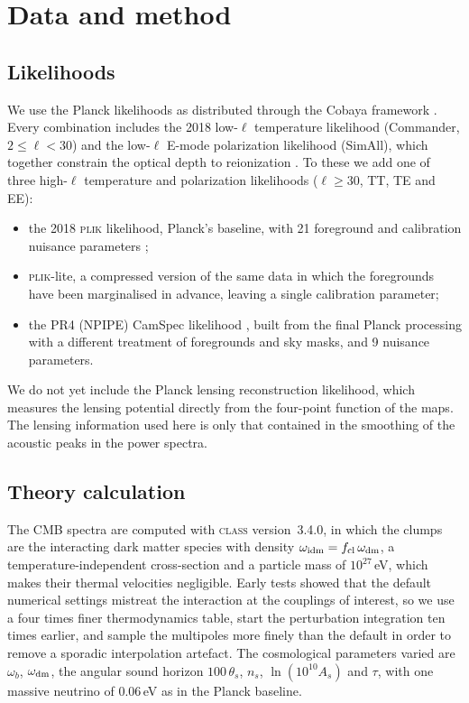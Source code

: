 \documentclass[11pt,a4paper]{article}
\newcommand{\cl}{\mathrm{cl}}
\begin{document}
\section{Data and method}
\label{sec:method}

\subsection{Likelihoods}

We use the Planck likelihoods as distributed through the Cobaya framework \citep{TorradoLewis2021}. Every combination includes the 2018 low-$\ell$ temperature likelihood (Commander, $2\le\ell<30$) and the low-$\ell$ E-mode polarization likelihood (SimAll), which together constrain the optical depth to reionization \citep{Planck2018V}. To these we add one of three high-$\ell$ temperature and polarization likelihoods ($\ell \ge 30$, TT, TE and EE):
\begin{itemize}
\item the 2018 \textsc{plik} likelihood, Planck's baseline, with 21 foreground and calibration nuisance parameters \citep{Planck2018V};
\item \textsc{plik}-lite, a compressed version of the same data in which the foregrounds have been marginalised in advance, leaving a single calibration parameter;
\item the PR4 (NPIPE) CamSpec likelihood \citep{Rosenberg2022}, built from the final Planck processing with a different treatment of foregrounds and sky masks, and 9 nuisance parameters.
\end{itemize}
We do not yet include the Planck lensing reconstruction likelihood, which measures the lensing potential directly from the four-point function of the maps. The lensing information used here is only that contained in the smoothing of the acoustic peaks in the power spectra.

\subsection{Theory calculation}

The CMB spectra are computed with \textsc{class} version~3.4.0, in which the clumps are the interacting dark matter species with density $\omega_{\rm idm} = f_\cl\,\omega_{\rm dm}$, a temperature-independent cross-section and a particle mass of $10^{27}$\,eV, which makes their thermal velocities negligible. Early tests showed that the default numerical settings mistreat the interaction at the couplings of interest, so we use a four times finer thermodynamics table, start the perturbation integration ten times earlier, and sample the multipoles more finely than the default in order to remove a sporadic interpolation artefact. The cosmological parameters varied are $\omega_b$, $\omega_{\rm dm}$, the angular sound horizon $100\,\theta_s$, $n_s$, $\ln(10^{10}A_s)$ and $\tau$, with one massive neutrino of 0.06\,eV as in the Planck baseline.
\end{document}
